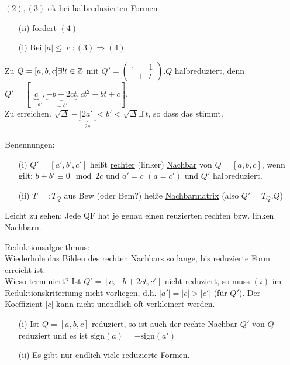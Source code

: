 \documentclass[a4paper,twoside,DIV15,BCOR12mm]{scrbook}
\begin{document}
\begin{beweis}
$(2), (3)$ ok bei halbreduzierten Formen
\begin{itemize}
\item[(ii)] fordert $(4)$
\item[(i)] Bei $|a| \le |c|: (3) \Rightarrow (4)$
\end{itemize}
\end{beweis}

\begin{bemerkung}
Zu $Q = [a,b,c] \exists ! t \in \mathbb{Z}$ mit $Q' = \begin{pmatrix}\cdot & 1 \\ -1 & t\end{pmatrix}.Q$ halbreduziert, denn $Q' = [\underbrace{c}_{=a'}, \underbrace{-b+2ct}_{=b'}, ct^2 - bt + c]$.\\
Zu erreichen. $\sqrt{\Delta} - \underbrace{|2a'|}_{|2c|} < b' < \sqrt{\Delta} \exists ! t$, so dass das stimmt.
\end{bemerkung}

Benennungen:
\begin{itemize}
\item[(i)] $Q' = [a',b',c']$ heißt \underline{rechter} (linker) \underline{Nachbar} von $Q = [a,b,c]$, wenn gilt: $b + b' \equiv 0 \mod 2c$ und $a' = c$ $(a = c')$ und $Q'$ halbreduziert.
\item[(ii)] $T =: T_Q$ aus Bew (oder Bem?) heiße \underline{Nachbarmatrix} (also $Q' = T_Q.Q$)
\end{itemize}

Leicht zu sehen: Jede QF hat je genau einen reuzierten rechten bzw. linken Nachbarn.

Reduktionsalgorithmus:\\
Wiederhole das Bilden des rechten Nachbars so lange, bis reduzierte Form erreicht ist.\\
Wieso terminiert? Ist $Q' = [c, -b+2ct, c']$ nicht-reduziert, so muss $(i)$ im Reduktionskriteriumg nicht vorliegen, d.h. $|a'| = |c| > |c'|$ (für $Q'$). Der Koeffizient $|c|$ kann nicht unendlich oft verkleinert werden.

\begin{satz}[Nachbarreduktionssatz]
\begin{itemize}
\item[(i)] Ist $Q = [a,b,c]$ reduziert, so ist auch der rechte Nachbar $Q'$ von $Q$ reduziert und es ist $\text{sign}(a) = -\text{sign}(a')$
\item[(ii)] Es gibt nur endlich viele reduzierte Formen.
\end{itemize}
\end{satz}
\end{document}
